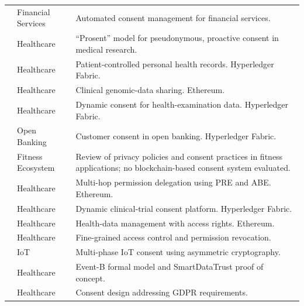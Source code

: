 \begin{longtable}{@{}>{\raggedright\arraybackslash}m{}>{\raggedright\arraybackslash}m{}>{\raggedright\arraybackslash}m{}@{}}
\addlinespace[5pt]
\cite{10.1109/SMDS53860.2021.00015} & Financial Services & Automated consent management for financial services. \\
\addlinespace[5pt]
\cite{10.1136/medethics-2019-105963} & Healthcare & ``Prosent'' model for pseudonymous, proactive consent in medical research. \\
\addlinespace[5pt]
\cite{10.3837/tiis.2021.12.008} & Healthcare & Patient-controlled personal health records. Hyperledger Fabric. \\
\addlinespace[5pt]
\cite{2021-dynamic-consent-genomic} & Healthcare & Clinical genomic-data sharing. Ethereum. \\
\addlinespace[5pt]
\cite{2021-dynamichain} & Healthcare & Dynamic consent for health-examination data. Hyperledger Fabric. \\
\addlinespace[5pt]
\cite{10.1007/978-981-15-9317-8_3} & Open Banking & Customer consent in open banking. Hyperledger Fabric. \\
\addlinespace[5pt]
\cite{10.1145/3511616.3513100} & Fitness Ecosystem & Review of privacy policies and consent practices in fitness applications; no blockchain-based consent system evaluated. \\
\addlinespace[5pt]
\cite{10.1016/j.hcc.2022.100084} & Healthcare & Multi-hop permission delegation using PRE and ABE. Ethereum. \\
\addlinespace[5pt]
\cite{10.3389/fmed.2022.837197} & Healthcare & Dynamic clinical-trial consent platform. Hyperledger Fabric. \\
\addlinespace[5pt]
\cite{2022-crowmedII-consent} & Healthcare & Health-data management with access rights. Ethereum. \\
\addlinespace[5pt]
\cite{2022-BDSS-blockchain-data-sharing} & Healthcare & Fine-grained access control and permission revocation. \\
\addlinespace[5pt]
\cite{10.1145/3576842.3582379} & IoT & Multi-phase IoT consent using asymmetric cryptography. \\
\addlinespace[5pt]
\cite{10.1016/j.jlamp.2023.100886} & Healthcare & Event-B formal model and SmartDataTrust proof of concept. \\
\addlinespace[5pt]
\cite{10.1109/ICOIN56518.2023.10048920} & Healthcare & Consent design addressing GDPR requirements. \\
\end{longtable}

